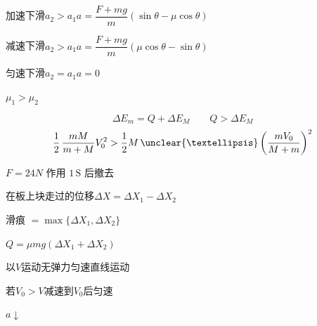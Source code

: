 \begin{problem}
\begin{solution}
加速下滑\quad $a_2>a_1$\quad $a=\dfrac{F+mg}{m}(\sin\theta-\mu\cos\theta)$ %

减速下滑\quad $a_2>a_1$\quad $a=\dfrac{F+mg}{m}(\mu\cos\theta-\sin\theta)$

匀速下滑\quad $a_2=a_1$\quad $a=0$
\end{solution}
\end{problem}
\begin{problem}
$\mu_1>\mu_2$
\begin{solution}
\[ \Delta E_m=Q+\Delta E_M\qquad Q>\Delta E_M \]
\[ \frac12\,\frac{mM}{m+M}V_0^2>\frac12M\,\unclear{…}\left(\frac{mV_0}{M+m}\right)^2 \] %
\end{solution}
\end{problem}
\begin{problem}
$F=24\unit{N}$ 作用 $1\,\mathrm{S}$ 后撤去
\begin{solution}
在板上块走过的位移\quad $\Delta X=\Delta X_1-\Delta X_2$

滑痕 $=\max\{\Delta X_1,\Delta X_2\}$

$Q=\mu mg(\Delta X_1+\Delta X_2)$
\end{solution}
\end{problem}
\begin{problem}
\begin{solution}
以$V$运动无弹力匀速直线运动

若$V_0>V$\quad 减速到$V_0$后匀速 %

$a\downarrow$
\end{solution}
\end{problem}
